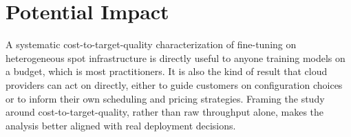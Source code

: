 \documentclass{article}
\begin{document}
\section{Potential Impact}
\par A systematic cost-to-target-quality characterization of fine-tuning on heterogeneous spot infrastructure is directly useful to anyone training models on a budget, which is most practitioners. It is also the kind of result that cloud providers can act on directly, either to guide customers on configuration choices or to inform their own scheduling and pricing strategies. Framing the study around cost-to-target-quality, rather than raw throughput alone, makes the analysis better aligned with real deployment decisions.
\end{document}

